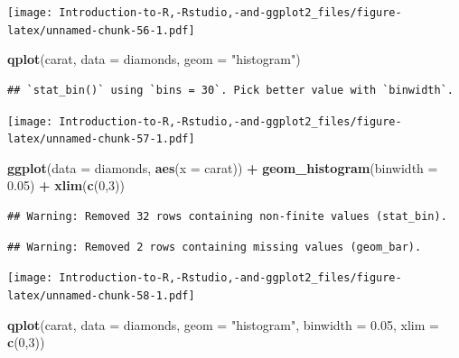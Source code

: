 \documentclass[]{book}
\newenvironment{Shaded}{\begin{snugshade}}{\end{snugshade}}
\newcommand{\DataTypeTok}[1]{\textcolor[rgb]{0.13,0.29,0.53}{#1}}
\newcommand{\DecValTok}[1]{\textcolor[rgb]{0.00,0.00,0.81}{#1}}
\newcommand{\FloatTok}[1]{\textcolor[rgb]{0.00,0.00,0.81}{#1}}
\newcommand{\KeywordTok}[1]{\textcolor[rgb]{0.13,0.29,0.53}{\textbf{#1}}}
\newcommand{\NormalTok}[1]{#1}
\newcommand{\OperatorTok}[1]{\textcolor[rgb]{0.81,0.36,0.00}{\textbf{#1}}}
\newcommand{\StringTok}[1]{\textcolor[rgb]{0.31,0.60,0.02}{#1}}
\begin{document}
\texttt{[image: Introduction-to-R,-Rstudio,-and-ggplot2\_files/figure-latex/unnamed-chunk-56-1.pdf]}

\begin{Shaded}
\begin{Highlighting}[]
\KeywordTok{qplot}\NormalTok{(carat, }\DataTypeTok{data =}\NormalTok{ diamonds, }\DataTypeTok{geom =} \StringTok{"histogram"}\NormalTok{)}
\end{Highlighting}
\end{Shaded}

\begin{verbatim}
## `stat_bin()` using `bins = 30`. Pick better value with `binwidth`.
\end{verbatim}

\texttt{[image: Introduction-to-R,-Rstudio,-and-ggplot2\_files/figure-latex/unnamed-chunk-57-1.pdf]}

\begin{Shaded}
\begin{Highlighting}[]
\KeywordTok{ggplot}\NormalTok{(}\DataTypeTok{data =}\NormalTok{ diamonds, }\KeywordTok{aes}\NormalTok{(}\DataTypeTok{x =}\NormalTok{ carat)) }\OperatorTok{+}\StringTok{ }\KeywordTok{geom_histogram}\NormalTok{(}\DataTypeTok{binwidth =} \FloatTok{0.05}\NormalTok{) }\OperatorTok{+}\StringTok{ }\KeywordTok{xlim}\NormalTok{(}\KeywordTok{c}\NormalTok{(}\DecValTok{0}\NormalTok{,}\DecValTok{3}\NormalTok{))}
\end{Highlighting}
\end{Shaded}

\begin{verbatim}
## Warning: Removed 32 rows containing non-finite values (stat_bin).
\end{verbatim}

\begin{verbatim}
## Warning: Removed 2 rows containing missing values (geom_bar).
\end{verbatim}

\texttt{[image: Introduction-to-R,-Rstudio,-and-ggplot2\_files/figure-latex/unnamed-chunk-58-1.pdf]}

\begin{Shaded}
\begin{Highlighting}[]
\KeywordTok{qplot}\NormalTok{(carat, }\DataTypeTok{data =}\NormalTok{ diamonds, }\DataTypeTok{geom =} \StringTok{"histogram"}\NormalTok{, }\DataTypeTok{binwidth =} \FloatTok{0.05}\NormalTok{, }\DataTypeTok{xlim =} \KeywordTok{c}\NormalTok{(}\DecValTok{0}\NormalTok{,}\DecValTok{3}\NormalTok{))}
\end{Highlighting}
\end{Shaded}
\end{document}

